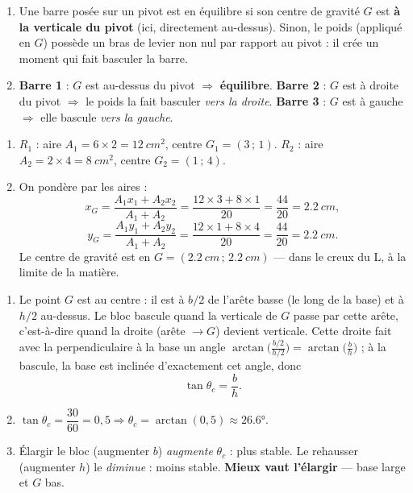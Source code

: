 \documentclass[11pt,a4paper]{article}
\begin{document}
\begin{corrige}
\begin{enumerate}[label=\alph*)]
  \item Une barre posée sur un pivot est en équilibre si son centre de gravité $G$ est \textbf{à la
        verticale du pivot} (ici, directement au-dessus). Sinon, le poids (appliqué en $G$) possède un
        bras de levier non nul par rapport au pivot : il crée un moment qui fait basculer la barre.
  \item \textbf{Barre 1} : $G$ est au-dessus du pivot $\Rightarrow$ \textbf{équilibre}. \textbf{Barre 2} :
        $G$ est à droite du pivot $\Rightarrow$ le poids la fait basculer \emph{vers la droite}.
        \textbf{Barre 3} : $G$ est à gauche $\Rightarrow$ elle bascule \emph{vers la gauche}.
\end{enumerate}
\end{corrige}

\begin{corrige}
\begin{enumerate}[label=\alph*)]
  \item $R_1$ : aire $A_1 = 6\times 2 = \qty{12}{cm^2}$, centre $G_1=(3\,;\,1)$.
        $R_2$ : aire $A_2 = 2\times 4 = \qty{8}{cm^2}$, centre $G_2=(1\,;\,4)$.
  \item On pondère par les aires :
        \[ x_G = \frac{A_1 x_1 + A_2 x_2}{A_1+A_2} = \frac{12\times 3 + 8\times 1}{20}
        = \frac{44}{20} = \qty{2.2}{cm}, \]
        \[ y_G = \frac{A_1 y_1 + A_2 y_2}{A_1+A_2} = \frac{12\times 1 + 8\times 4}{20}
        = \frac{44}{20} = \qty{2.2}{cm}. \]
        Le centre de gravité est en $G=(\qty{2.2}{cm}\,;\,\qty{2.2}{cm})$ — dans le creux du L, à la
        limite de la matière.
\end{enumerate}
\end{corrige}

\begin{corrige}
\begin{enumerate}[label=\alph*)]
  \item Le point $G$ est au centre : il est à $b/2$ de l'arête basse (le long de la base) et à $h/2$
        au-dessus. Le bloc bascule quand la verticale de $G$ passe par cette arête, c'est-à-dire quand
        la droite (arête $\to G$) devient verticale. Cette droite fait avec la perpendiculaire à la base
        un angle $\arctan\!\big(\tfrac{b/2}{h/2}\big)=\arctan\!\big(\tfrac{b}{h}\big)$ ; à la bascule, la base
        est inclinée d'exactement cet angle, donc
        \[ \tan\theta_c = \frac{b}{h}. \]
  \item $\tan\theta_c = \dfrac{30}{60} = 0{,}5 \Rightarrow \theta_c = \arctan(0{,}5)\approx\ang{26.6}$.
  \item Élargir le bloc (augmenter $b$) \emph{augmente} $\theta_c$ : plus stable. Le rehausser
        (augmenter $h$) le \emph{diminue} : moins stable. \textbf{Mieux vaut l'élargir} — base large et
        $G$ bas.
\end{enumerate}
\end{corrige}
\end{document}

